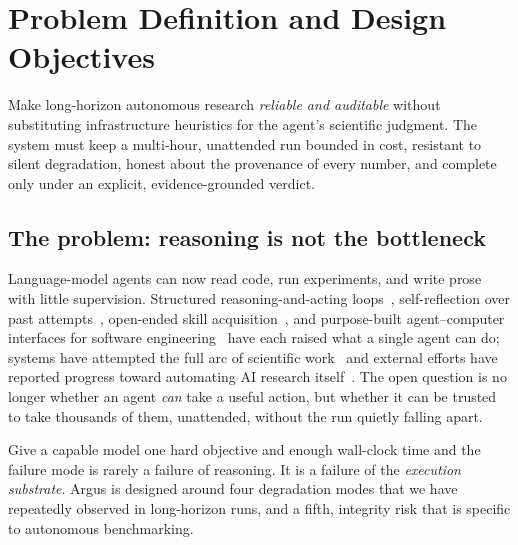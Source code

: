 \section{Problem Definition and Design Objectives}
\label{sec:problem}

\begin{designbox}
Make long-horizon autonomous research \emph{reliable and auditable} without
substituting infrastructure heuristics for the agent's scientific judgment. The
system must keep a multi-hour, unattended run bounded in cost, resistant to
silent degradation, honest about the provenance of every number, and complete
only under an explicit, evidence-grounded verdict.
\end{designbox}

\subsection{The problem: reasoning is not the bottleneck}

Language-model agents can now read code, run experiments, and write prose with
little supervision. Structured reasoning-and-acting loops~\cite{yao2023react},
self-reflection over past attempts~\cite{shinn2023reflexion}, open-ended skill
acquisition~\cite{wang2023voyager}, and purpose-built agent--computer interfaces
for software engineering~\cite{yang2024sweagent} have each raised what a single
agent can do; systems have attempted the full arc of scientific
work~\cite{lu2024aiscientist} and external efforts have reported progress toward
automating AI research itself~\cite{recursive2026firststeps}. The open question
is no longer whether an agent \emph{can} take a useful action, but whether it can
be trusted to take thousands of them, unattended, without the run quietly falling
apart.

Give a capable model one hard objective and enough wall-clock time and the
failure mode is rarely a failure of reasoning. It is a failure of the
\emph{execution substrate}. Argus is designed around four degradation modes that
we have repeatedly observed in long-horizon runs, and a fifth, integrity risk
that is specific to autonomous benchmarking.

